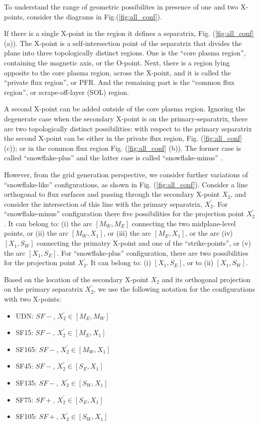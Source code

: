 To understand the range of geometric possibilites in presence of one
and two X-points, consider the diagrams in Fig.(\ref{fig:all_conf}).

If there is a single X-point in the region it defines a separatrix,
Fig. (\ref{fig:all_conf} (a)). The X-point is a self-intersection
point of the separatrix that divides the plane into three
topologically distinct regions. One is the ``core plasma region'',
containing the magnetic axis, or the O-point. Next, there is a region
lying opposite to the core plasma region, across the X-point, and it
is called the ``private flux region'', or PFR. And the remaining part
is the ``common flux region'', or scrape-off-layer (SOL) region.

A second X-point can be added outside of the core plasma region. Ignoring the degenerate case when the secondary X-point is on the primary-separatrix, there are two topologically
distinct possibilities: with respect to the primary separatrix the
second X-point can be either in the private flux region,
Fig. (\ref{fig:all_conf} (c)); or in the common flux region
Fig. (\ref{fig:all_conf} (b)). The former case is called
``snowflake-plus'' and the latter case is called ``snowflake-minus''
\cite{Ryutov2007}.

However, from the grid generation perspective, we consider further
variations of ``snowflake-like'' configurations, as shown in
Fig. (\ref{fig:all_conf}). Consider a line orthogonal to flux surfaces
and passing through the secondary X-point $X_2$, and consider the
intersection of this line with the primary separatrix,
$X^{\prime}_2$. For ``snowflake-minus'' configuration there five
possibilities for the projection point $X^{\prime}_2$. It can belong
to: (i) the arc $[M_W,M_E]$ connecting the two midplane-level points,
or (ii) the arc $[M_W,X_1]$, or (iii) the arc $[M_E,X_1]$, or the arc
(iv) $[X_1,S_W]$ connecting the primatry X-point and one of the
``strike-points'', or (v) the arc $[X_1,S_E]$. For ``snowflake-plus''
configuration, there are two possibilities for the projection point
$X^{\prime}_2$. It can belong to: (i) $[X_1,S_E]$, or to (ii)
$[X_1,S_W]$.

Based on the location of the secondary X-point $X_2$ and its
orthogonal projection on the primary separatrix $X_2^{\prime}$, we use
the following notation for the configurations with two X-points:

\begin{itemize}
	\item UDN: $SF-$, $X^{\prime}_2 \in [M_E,M_W]$
	\item SF15: $SF-$, $X^{\prime}_2 \in [M_E,X_1]$
	\item SF165: $SF-$, $X^{\prime}_2 \in [M_W,X_1]$
        \item SF45: $SF-$, $X^{\prime}_2 \in [S_E,X_1]$
        \item SF135: $SF-$, $X^{\prime}_2 \in [S_W,X_1]$
        \item SF75: $SF+$, $X^{\prime}_2 \in [S_E,X_1]$
        \item SF105: $SF+$, $X^{\prime}_2 \in [S_W,X_1]$
\end{itemize}

